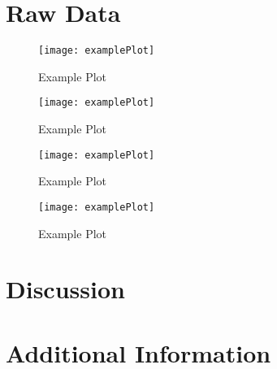 \documentclass{LeanTestReport}
\begin{document}

\section*{Raw Data}

\lipsum[1]

\begin{figure}[H]
\centering
\texttt{[image: examplePlot]}
\caption{Example Plot}
\end{figure}

\lipsum[1-2]

\begin{figure}[H]
\centering
\texttt{[image: examplePlot]}
\caption{Example Plot}
\end{figure}

\begin{figure}[H]
\centering
\texttt{[image: examplePlot]}
\caption{Example Plot}
\end{figure}

\begin{figure}[H]
\centering
\texttt{[image: examplePlot]}
\caption{Example Plot}
\end{figure}

\section*{Discussion}

\lipsum[6-9]

\section*{Additional Information}

\lipsum[10]
\end{document}
